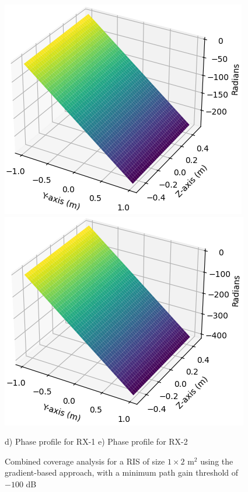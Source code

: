 \documentclass{IEEEoj}
\begin{document}
\begin{figure}
	\includegraphics[width=0.48\linewidth]{Sim_Results/pp_-100dB_gradient_RX1.png}
	\hfill
	\includegraphics[width=0.48\linewidth]{Sim_Results/pp_-100dB_gradient_RX2.png}
	
	\hspace{10pt} d) Phase profile for RX-1 \hspace{15pt} e) Phase profile for RX-2
	\caption{Combined coverage analysis for a RIS of size $1 \times 2$ m$^2$ using the gradient-based approach, with a minimum path gain threshold of $-100$ dB}
	\label{comb_cov_gradient}
\end{figure}
\end{document}
